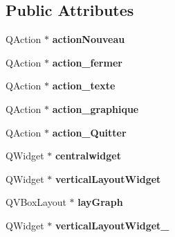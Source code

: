 \subsection*{Public Attributes}
\begin{DoxyCompactItemize}
\item 
\hypertarget{class_ui___main_window_af9527ce04b754db417c1b573e9e1fd62}{}Q\+Action $\ast$ {\bfseries action\+Nouveau}\label{class_ui___main_window_af9527ce04b754db417c1b573e9e1fd62}

\item 
\hypertarget{class_ui___main_window_a0392dc0a55789a3554a620a2ef0519c1}{}Q\+Action $\ast$ {\bfseries action\+\_\+fermer}\label{class_ui___main_window_a0392dc0a55789a3554a620a2ef0519c1}

\item 
\hypertarget{class_ui___main_window_a7fc0c4e080d19a349813fb98516c0ff5}{}Q\+Action $\ast$ {\bfseries action\+\_\+texte}\label{class_ui___main_window_a7fc0c4e080d19a349813fb98516c0ff5}

\item 
\hypertarget{class_ui___main_window_a8f386223284853b0ba0780e34d4d6b0b}{}Q\+Action $\ast$ {\bfseries action\+\_\+graphique}\label{class_ui___main_window_a8f386223284853b0ba0780e34d4d6b0b}

\item 
\hypertarget{class_ui___main_window_a5035a37a5ba26f6b6a780a06d9a7efd0}{}Q\+Action $\ast$ {\bfseries action\+\_\+\+Quitter}\label{class_ui___main_window_a5035a37a5ba26f6b6a780a06d9a7efd0}

\item 
\hypertarget{class_ui___main_window_a39420100bfee3ba57f137af5a3b0f8e9}{}Q\+Widget $\ast$ {\bfseries centralwidget}\label{class_ui___main_window_a39420100bfee3ba57f137af5a3b0f8e9}

\item 
\hypertarget{class_ui___main_window_a09dd64182e7897287cfa8ef83f32f29e}{}Q\+Widget $\ast$ {\bfseries vertical\+Layout\+Widget}\label{class_ui___main_window_a09dd64182e7897287cfa8ef83f32f29e}

\item 
\hypertarget{class_ui___main_window_af028ba22a4ea9a93f824d7e779d5b420}{}Q\+V\+Box\+Layout $\ast$ {\bfseries lay\+Graph}\label{class_ui___main_window_af028ba22a4ea9a93f824d7e779d5b420}

\item 
\hypertarget{class_ui___main_window_a7066c0dc4d56abac815596640236ddf9}{}Q\+Widget $\ast$ {\bfseries vertical\+Layout\+Widget\+\_}\label{class_ui___main_window_a7066c0dc4d56abac815596640236ddf9}


\end{DoxyCompactItemize}
